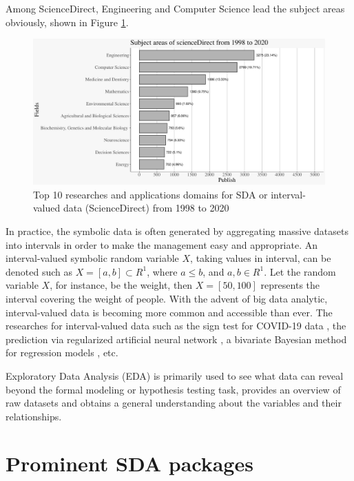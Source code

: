 \documentclass[article]{jss}
\newcommand{\imgdir}{../../../paperImage/}
\begin{document}
Among ScienceDirect, Engineering and Computer Science lead the subject areas obviously, shown in Figure \ref{fig:subjectAreas}.

\begin{figure}[h]	
  		\centering	 			 	 
\includegraphics{ggESDA_Jiang&Wu_20210915-subjectFig}
  		\caption{Top 10 researches and applications domains for SDA or interval-valued data (ScienceDirect) from 1998 to 2020} 
  		\label{fig:subjectAreas}   			 		 
\end{figure}


In practice, the symbolic data is often generated by aggregating massive datasets into intervals in order to make the management easy and appropriate. An interval-valued symbolic random variable $X$, taking values in interval, can be denoted such as $X = [a,b] \subset  R^{1}$, where $a \leq b$, and $a, b \in R^{1}$. Let the random variable $X$, for instance, be the weight, then $X = [50,100]$ represents the interval covering the weight of people. With the advent of big data analytic, interval-valued data is becoming more common and accessible than ever. The researches for interval-valued data such as the sign test for COVID-19 data \cite{sherwani:2021}, the prediction via regularized artificial neural network \cite{yang:2019}, a bivariate Bayesian method for regression models \cite{xu:2021}, etc.

Exploratory Data Analysis (EDA) \cite{Tukey:1977} is primarily used to see what data can reveal beyond the formal modeling or hypothesis testing task, provides an overview of raw datasets and obtains a general understanding about the variables and their relationships.


\section{Prominent SDA packages}
\end{document}
